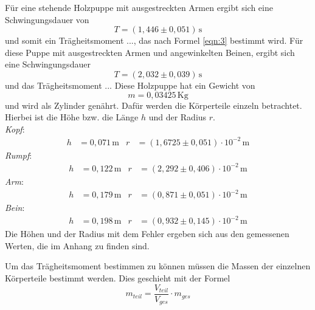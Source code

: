 \documentclass[
  bibliography=totoc,     %
  captions=tableheading,  %
  titlepage=firstiscover, %
]{scrartcl}
\begin{document}
Für eine stehende Holzpuppe mit ausgestreckten Armen ergibt sich eine Schwingungsdauer von
\begin{equation}
  T= (1,446 \pm 0,051) \, \mathrm{s}
\end{equation}
und somit ein Trägheitsmoment ..., das nach Formel \ref{eqn:3} bestimmt wird.
Für diese Puppe mit ausgestreckten Armen und angewinkelten Beinen,
ergibt sich eine Schwingungsdauer
\begin{equation}
  T= (2,032 \pm 0,039) \, \mathrm{s}
\end{equation}
 und das Trägheitsmoment ...
Diese Holzpuppe hat ein Gewicht von
\begin{equation}
m= 0,03425 \, \mathrm{Kg}
\end{equation}
und wird als Zylinder genährt.
Dafür werden die Körperteile einzeln betrachtet.
Hierbei ist die Höhe bzw. die Länge  $h$ und der Radius $r$. \\

\emph{Kopf}:
\begin{align}
  h &= 0,071 \, \mathrm{m} & r &= (1,6725 \pm 0,051) \cdot 10^{-2} \, \mathrm{m}
\end{align}
\emph{Rumpf}:
\begin{align}
h &= 0,122 \, \mathrm{m} & r &= (2,292 \pm 0,406) \cdot 10^{-2} \, \mathrm{m}
\end{align}
\emph{Arm}:
\begin{align}
h &= 0,179 \, \mathrm{m} & r &= (0,871 \pm 0,051) \cdot 10^{-2} \, \mathrm{m}
\end{align}
\emph{Bein}:
\begin{align}
h &= 0,198 \, \mathrm{m} & r &= (0,932 \pm 0,145) \cdot 10^{-2} \, \mathrm{m}
\end{align}
Die Höhen und der Radius mit dem Fehler ergeben sich aus den gemessenen Werten,
die im Anhang zu finden sind.

Um das Trägheitsmoment bestimmen zu können müssen die Massen der einzelnen Körperteile bestimmt werden.
Dies geschieht mit der Formel
\begin{equation}
  m_{teil}= \frac{V_{teil}}{V_{ges}}\cdot m_{ges}
\end{equation}
\end{document}
